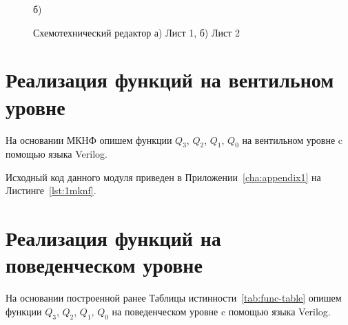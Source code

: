 \begin{figure}[h!]
\begin{minipage}[h]{0.47\linewidth}
		 б) \\
	\end{minipage}
	\caption{Схемотехнический редактор а) Лист 1, б) Лист 2}
	\label{fig:circ-editor}
\end{figure}


\newpage
\section{Реализация функций на вентильном уровне}
На основании МКНФ опишем функции $Q_3$,  $Q_2$, $Q_1$,  $Q_0$ на вентильном уровне c помощью языка Verilog.

Исходный код данного модуля приведен в Приложении~\ref{cha:appendix1} на Листинге~\ref{lst:1mknf}.

%

\section{Реализация функций на поведенческом уровне}
На основании построенной ранее Таблицы истинности~\ref{tab:func-table} опишем функции $Q_3$,  $Q_2$, $Q_1$,  $Q_0$ на поведенческом уровне c помощью языка Verilog.

